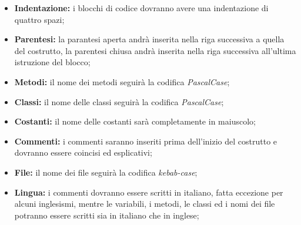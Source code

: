 \begin{itemize}
    \item \textbf{Indentazione:} i blocchi di codice dovranno avere una indentazione di quattro spazi;
    \item \textbf{Parentesi:} la parantesi aperta andrà inserita nella riga successiva a quella del costrutto, la parentesi chiusa andrà inserita nella riga successiva all'ultima istruzione del blocco;
    \item \textbf{Metodi:} il nome dei metodi seguirà la codifica \textit{PascalCase};
    \item \textbf{Classi:} il nome delle classi seguirà la codifica \textit{PascalCase};
    \item \textbf{Costanti:} il nome delle costanti sarà completamente in maiuscolo;
    \item \textbf{Commenti:} i commenti saranno inseriti prima dell'inizio del costrutto e dovranno essere coincisi ed esplicativi;
    \item \textbf{File:} il nome dei file seguirà la codifica \textit{kebab-case};
    \item \textbf{Lingua:} i commenti dovranno essere scritti in italiano, fatta eccezione per alcuni inglesismi, mentre le variabili, i metodi, le classi ed i nomi dei file potranno essere scritti sia in italiano che in inglese;
\end{itemize}